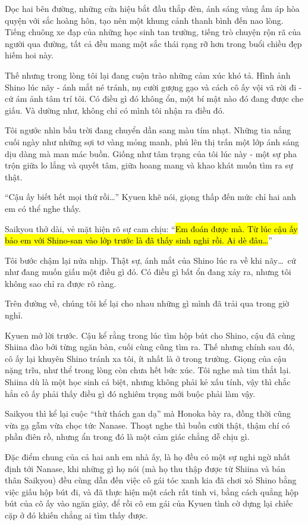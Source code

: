 \documentclass[../main.tex]{subfiles}
\begin{document}
Dọc hai bên đường, những cửa hiệu bắt đầu thắp đèn, ánh sáng vàng ấm áp hòa quyện với sắc hoàng hôn, tạo nên một khung cảnh thanh bình đến nao lòng. Tiếng chuông xe đạp của những học sinh tan trường, tiếng trò chuyện rộn rã của người qua đường, tất cả đều mang một sắc thái rạng rỡ hơn trong buổi chiều đẹp hiếm hoi này.

Thế nhưng trong lòng tôi lại đang cuộn trào những cảm xúc khó tả. Hình ảnh Shino lúc nãy - ánh mắt né tránh, nụ cười gượng gạo và cách cô ấy vội vã rời đi - cứ ám ảnh tâm trí tôi. Có điều gì đó không ổn, một bí mật nào đó đang được che giấu. Và dường như, không chỉ có mình tôi nhận ra điều đó.

Tôi ngước nhìn bầu trời đang chuyển dần sang màu tím nhạt. Những tia nắng cuối ngày như những sợi tơ vàng mỏng manh, phủ lên thị trấn một lớp ánh sáng dịu dàng mà man mác buồn. Giống như tâm trạng của tôi lúc này - một sự pha trộn giữa lo lắng và quyết tâm, giữa hoang mang và khao khát muốn tìm ra sự thật.

``Cậu ấy biết hết mọi thứ rồi\dots'' Kyuen khẽ nói, giọng thấp đến mức chỉ hai anh em có thể nghe thấy.

Saikyou thở dài, vẻ mặt hiện rõ sự cam chịu: ``\hl{Em đoán được mà. Từ lúc cậu ấy bảo em với Shino-san vào lớp trước là đã thấy sinh nghi rồi. Ai dè đâu\dots}''

Tôi bước chậm lại nửa nhịp. Thật sự, ánh mắt của Shino lúc ra về khi nãy\dots\ cứ như đang muốn giấu một điều gì đó. Có điều gì bất ổn đang xảy ra, nhưng tôi không sao chỉ ra được rõ ràng.

Trên đường về, chúng tôi kể lại cho nhau những gì mình đã trải qua trong giờ nghỉ.

Kyuen mở lời trước. Cậu kể rằng trong lúc tìm hộp bút cho Shino, cậu đã cùng Shiina đào bới từng ngăn bàn, cuối cùng cũng tìm ra. Thế nhưng chính sau đó, cô ấy lại khuyên Shino tránh xa tôi, ít nhất là ở trong trường. Giọng của cậu nặng trĩu, như thể trong lòng còn chưa hết bức xúc. Tôi nghe mà tim thắt lại. Shiina dù là một học sinh cá biệt, nhưng không phải kẻ xấu tính, vậy thì chắc hẳn cô ấy phải thấy điều gì đó nghiêm trọng mới buộc phải làm vậy.

Saikyou thì kể lại cuộc ``thử thách gan dạ'' mà Honoka bày ra, đồng thời cũng vừa gạ gẫm vừa chọc tức Nanase. Thoạt nghe thì buồn cười thật, thậm chí có phần điên rồ, nhưng ẩn trong đó là một cảm giác chẳng dễ chịu gì.

Đặc điểm chung của cả hai anh em nhà ấy, là họ đều có một sự nghi ngờ nhất định tới Nanase, khi những gì họ nói (mà họ thu thập được từ Shiina và bản thân Saikyou) đều cùng dẫn đến việc cô gái tóc xanh kia đã chơi xỏ Shino bằng việc giấu hộp bút đi, và đã thực hiện một cách rất tinh vi, bằng cách quẳng hộp bút của cô ấy vào ngăn giày, để rồi cô em gái của Kyuen tình cờ dựng lại chiếc cặp ở đó khiến chẳng ai tìm thấy được.
\end{document}
